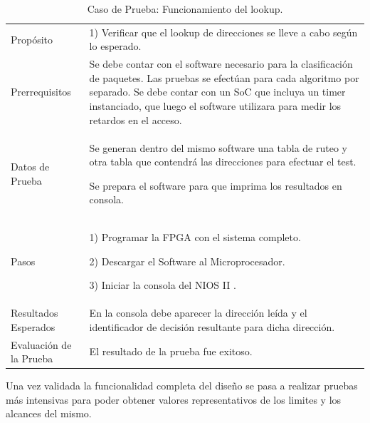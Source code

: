 \begin{table}
	\begin{tabular}{|>{\columncolor[gray]{0.8}}l|p{11cm}|} \hline
\multicolumn{2}{|>{\columncolor[gray]{0.8}}l|}{\textbf{Caso de Prueba: Funcionamiento de los algoritmos de clasificación }}\\ \hline
Propósito  & 1) Verificar que el lookup de direcciones se lleve a cabo según lo esperado.

\\ \hline
 Prerrequisitos  & Se debe contar con el software necesario para la clasificación de paquetes. Las pruebas se efectúan para cada algoritmo por separado. Se debe contar con un SoC que incluya un timer instanciado, que luego el software utilizara para medir los retardos en el acceso.
 \\ \hline
 Datos de Prueba & Se generan dentro del mismo software una tabla de ruteo y otra tabla que contendrá las direcciones para efectuar el test. 

Se prepara el software para que imprima los resultados en consola. 
 \\ \hline
 Pasos & 1) Programar la FPGA con el sistema completo.

2) Descargar el Software al Microprocesador. 

3) Iniciar la consola del NIOS II .
\\ \hline
 Resultados Esperados & En la consola debe aparecer la dirección leída y el identificador de decisión resultante para dicha dirección. \\ \hline
 Evaluación de la Prueba  & El resultado de la prueba fue exitoso.\\ \hline
	\end{tabular}
	\caption{Caso de Prueba: Funcionamiento del lookup.}
	\label{tab:retlook}
\end{table}


Una vez validada la funcionalidad completa del diseño se pasa a realizar pruebas más intensivas para poder obtener valores representativos de los limites y los alcances del mismo.

